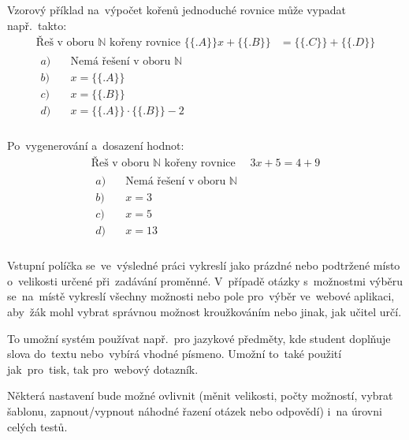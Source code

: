 \documentclass[11pt,a4paper]{report}
\begin{document}
            Vzorový příklad na~výpočet kořenů jednoduché rovnice může vypadat např.~takto:
            \begin{align*}
                \text{Řeš v~oboru $\mathbb{N}$ kořeny rovnice } \{\{.A\}\}x + \{\{.B\}\} &= \{\{.C\}\} + \{\{.D\}\} \\
                \begin{aligned}
                    a) \quad &\text{Nemá řešení v oboru $\mathbb{N}$}\\
                    b) \quad &x = \{\{.A\}\} \\
                    c) \quad &x = \{\{.B\}\} \\
                    d) \quad &x = \{\{.A\}\} \cdot \{\{.B\}\} - 2 \\
                \end{aligned}
            \end{align*}

            Po~vygenerování a~dosazení hodnot:
            \begin{align*}
                \text{Řeš v~oboru $\mathbb{N}$ kořeny rovnice } \quad 3x + 5 = 4 + 9 \\
                \begin{aligned}
                    a) \quad &\text{Nemá řešení v oboru }\mathbb{N} \\
                    b) \quad &x = 3 \\
                    c) \quad &x = 5 \\
                    d) \quad &x = 13 \\
                \end{aligned}
            \end{align*}

            Vstupní políčka se~ve~výsledné práci vykreslí jako prázdné nebo podtržené místo o~velikosti určené při~zadávání proměnné. V~případě otázky s~možnostmi výběru se~na~místě vykreslí všechny možnosti nebo pole pro~výběr ve~webové aplikaci, aby~žák mohl vybrat správnou možnost kroužkováním nebo jinak, jak učitel určí.
            
            To umožní systém používat např.~pro jazykové předměty, kde student doplňuje slova do~textu nebo~vybírá vhodné písmeno. Umožní to~také použití jak~pro~tisk, tak pro~webový dotazník.

            Některá nastavení bude možné ovlivnit (měnit velikosti, počty možností, vybrat šablonu, zapnout/vypnout náhodné řazení otázek nebo odpovědí) i~na úrovni celých testů.
\end{document}
